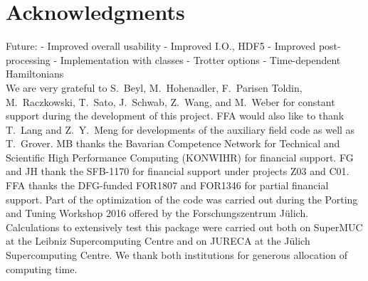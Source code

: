 

\section*{Acknowledgments} 


Future: - Improved overall usability
- Improved I.O., HDF5
- Improved post-processing
- Implementation with classes
- Trotter options
- Time-dependent Hamiltonians\\

We are very grateful to  S.~Beyl, M.~Hohenadler,  F.~Parisen Toldin,  M.~Raczkowski, T.~Sato, J.~Schwab, Z.~Wang, and M.~Weber  for constant support during the development of this project. 
FFA would also like to thank T.~Lang   and Z.~Y.~Meng for  developments of the auxiliary field code as well as T.~Grover. 
MB thanks the Bavarian Competence Network for Technical and Scientific High Performance Computing (KONWIHR) for financial support. FG  and JH thank the SFB-1170 for  financial support under projects Z03 and C01.  FFA thanks the DFG-funded FOR1807 and FOR1346 for partial financial support.
Part of the optimization of the code was carried out during  the  Porting and Tuning Workshop 2016 offered by the Forschungszentrum J\"ulich.
Calculations  to extensively test this package were carried out both on  SuperMUC at the  Leibniz Supercomputing Centre and on  JURECA  \cite{Jureca16} at the J\"ulich Supercomputing Centre.  We thank both institutions for generous allocation of computing time.
